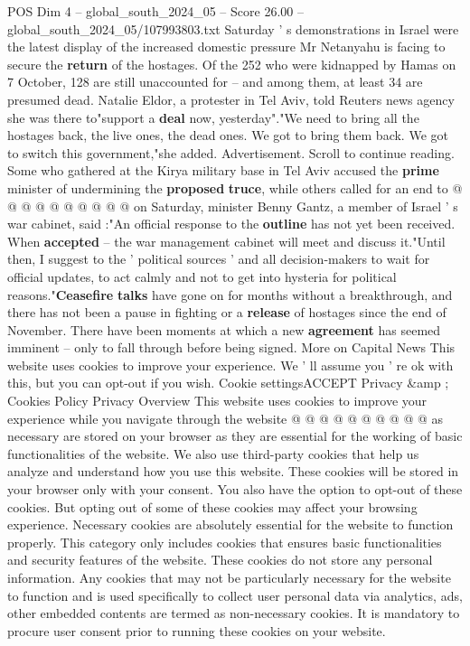\begin{textsample}{POS Dim 4 – global\_south\_2024\_05 – Score 26.00 – global\_south\_2024\_05/107993803.txt}
Saturday ' s demonstrations in Israel were the latest display of the increased domestic pressure Mr Netanyahu is facing to secure the \textbf{return} of the hostages.
Of the 252 who were kidnapped by Hamas on 7 October, 128 are still unaccounted for -- and among them, at least 34 are presumed dead.
Natalie Eldor, a protester in Tel Aviv, told Reuters news agency she was there to"support a \textbf{deal} now, yesterday"."We need to bring all the hostages back, the live ones, the dead ones.
We got to bring them back.
We got to switch this government,"she added.
Advertisement.
Scroll to continue reading.
Some who gathered at the Kirya military base in Tel Aviv accused the \textbf{prime} minister of undermining the \textbf{proposed} \textbf{truce}, while others called for an end to @ @ @ @ @ @ @ @ @ @ on Saturday, minister Benny Gantz, a member of Israel ' s war cabinet, said :"An official response to the \textbf{outline} has not yet been received.
When \textbf{accepted} -- the war management cabinet will meet and discuss it."Until then, I suggest to the ' political sources ' and all decision-makers to wait for official updates, to act calmly and not to get into hysteria for political reasons."\textbf{Ceasefire} \textbf{talks} have gone on for months without a breakthrough, and there has not been a pause in fighting or a \textbf{release} of hostages since the end of November.
There have been moments at which a new \textbf{agreement} has seemed imminent -- only to fall through before being signed.
More on Capital News This website uses cookies to improve your experience.
We ' ll assume you ' re ok with this, but you can opt-out if you wish.
Cookie settingsACCEPT Privacy \&amp ; Cookies Policy Privacy Overview This website uses cookies to improve your experience while you navigate through the website @ @ @ @ @ @ @ @ @ @ as necessary are stored on your browser as they are essential for the working of basic functionalities of the website.
We also use third-party cookies that help us analyze and understand how you use this website.
These cookies will be stored in your browser only with your consent.
You also have the option to opt-out of these cookies.
But opting out of some of these cookies may affect your browsing experience.
Necessary cookies are absolutely essential for the website to function properly.
This category only includes cookies that ensures basic functionalities and security features of the website.
These cookies do not store any personal information.
Any cookies that may not be particularly necessary for the website to function and is used specifically to collect user personal data via analytics, ads, other embedded contents are termed as non-necessary cookies.
It is mandatory to procure user consent prior to running these cookies on your website.

\end{textsample}
